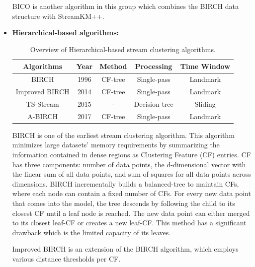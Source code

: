 \documentclass[../UNBThesis2.tex]{subfiles}
\begin{document}
\begin{itemize}
BICO \cite{fichtenberger2013bico} is another algorithm in this group which combines the BIRCH data structure with StreamKM++. 






\item\textbf{Hierarchical-based algorithms:}

\begin{table}[h]
    \centering
    \caption{Overview of Hierarchical-based stream clustering algorithms. }
    \label{hirarcha}
    \small
    \begin{tabular}{c c c c c}
    \hline
      \textbf{Algorithms} & \textbf{Year} & \textbf{ Method } & \textbf{Processing} & \textbf{ Time Window}  \\
     \hline \midrule

      BIRCH             &    1996        &     CF-tree  &  Single-pass       & Landmark \\
     \hline
     Improved BIRCH     &    2014        &    CF-tree   &    Single-pass     & Landmark \\
      \hline
      TS-Stream         &     2015       &    -      &     Decision tree  & Sliding  \\
    \hline 
      A-BIRCH           &    2017        &   CF-tree    &   Single-pass      & Landmark\\
\bottomrule
    \end{tabular}
\end{table}

BIRCH \cite{zhang1996birch} is one of the earliest stream clustering algorithm. This algorithm minimizes large datasets' memory requirements by summarizing the information contained in dense regions as Clustering Feature (CF) entries. CF has three components: number of data points, the d-dimensional vector with the linear sum of all data points, and sum of squares for all data points across dimensions. BIRCH incrementally builds a balanced-tree to maintain CFs, where each node can contain a fixed number of CFs. 
For every new data point that comes into the model, the tree descends by following the child to its closest CF until a leaf node is reached. The new data point can either merged to its closest leaf-CF or creates a new leaf-CF. This method has a significant drawback which is the limited capacity of its leaves.

Improved BIRCH \cite{ismael2014improved} is an extension of the BIRCH algorithm, which employs various distance thresholds per CF.


\end{itemize}
\end{document}
